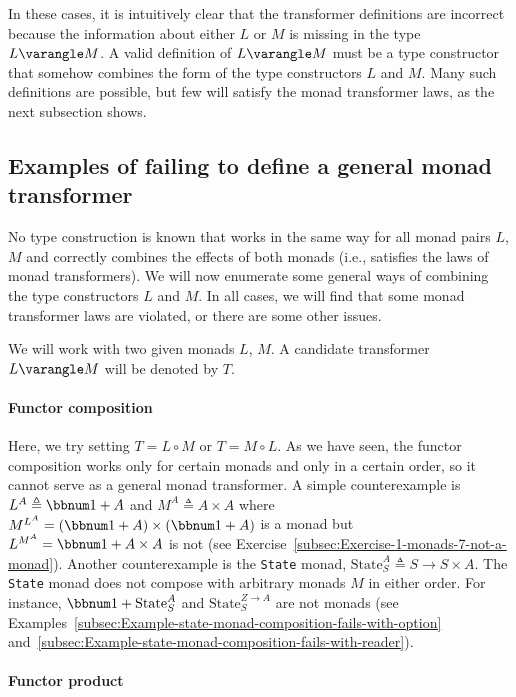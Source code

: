 In these cases, it is intuitively clear that the transformer definitions
are incorrect because the information about either $L$ or $M$ is
missing in the type $L\varangle M$. A valid definition of $L\varangle M$
must be a type constructor that somehow combines the form of the type
constructors $L$ and $M$. Many such definitions are possible, but
few will satisfy the monad transformer laws, as the next subsection
shows.

\subsection{Examples of failing to define a general monad transformer\label{subsec:Examples-of-failure-of-generic-monad-transformer}}

No type construction is known that works in the same way for all monad
pairs $L$, $M$ and correctly combines the effects of both monads
(i.e., satisfies the laws of monad transformers). We will now enumerate
some general ways of combining the type constructors $L$ and $M$.
In all cases, we will find that some monad transformer laws are violated,
or there are some other issues.

We will work with two given monads $L$, $M$. A candidate transformer
$L\varangle M$ will be denoted by $T$.


\paragraph{Functor composition}

Here, we try setting $T=L\circ M$ or $T=M\circ L$. As we have seen,
the functor composition works only for certain monads and only in
a certain order, so it cannot serve as a general monad transformer.
A simple counterexample is $L^{A}\triangleq\bbnum 1+A$ and $M^{A}\triangleq A\times A$
where $M^{L^{A}}=\left(\bbnum 1+A\right)\times\left(\bbnum 1+A\right)$
is a monad but $L^{M^{A}}=\bbnum 1+A\times A$ is not (see Exercise~\ref{subsec:Exercise-1-monads-7-not-a-monad}).
Another counterexample is the \lstinline!State! monad, $\text{State}_{S}^{A}\triangleq S\rightarrow S\times A$.
The \lstinline!State! monad does not compose with arbitrary monads
$M$ in either order. For instance, $\bbnum 1+\text{State}_{S}^{A}$
and $\text{State}_{S}^{Z\rightarrow A}$ are not monads (see Examples~\ref{subsec:Example-state-monad-composition-fails-with-option}
and~\ref{subsec:Example-state-monad-composition-fails-with-reader}). 

\paragraph{Functor product}

